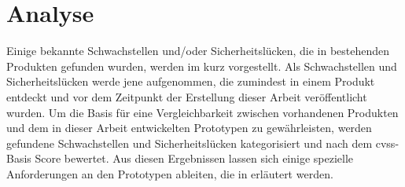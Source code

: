 \section{Analyse}
\label{sec:analysis}
	Einige bekannte Schwachstellen und/oder Sicherheitslücken, die in bestehenden Produkten gefunden wurden, werden im  kurz vorgestellt. 
	Als Schwachstellen und Sicherheitslücken werde jene aufgenommen, die zumindest in einem Produkt entdeckt und vor dem Zeitpunkt der Erstellung dieser Arbeit veröffentlicht wurden. 
	Um die Basis für eine Vergleichbarkeit zwischen vorhandenen Produkten und dem in dieser Arbeit entwickelten Prototypen zu gewährleisten, werden gefundene Schwachstellen und Sicherheitslücken kategorisiert und nach dem \gls{cvss}-Basis Score bewertet.
	Aus diesen Ergebnissen lassen sich einige spezielle Anforderungen an den Prototypen ableiten, die in  erläutert werden.
